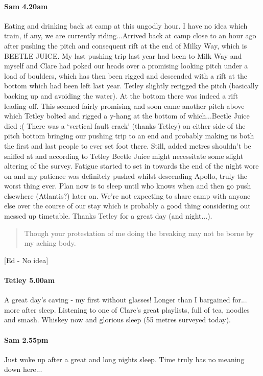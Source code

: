 \paragraph{Sam 4.20am}
Eating and drinking back at camp at this ungodly hour. I have no idea which train, if any, we are currently riding...Arrived back at camp close to an hour ago after pushing the pitch and consequent rift at the end of Milky Way, which is BEETLE JUICE. My last pushing trip last year had been to Milk Way and myself and Clare had poked our heads over a promising looking pitch under a load of boulders, which has then been rigged and descended with a rift at the bottom which had been left last year. Tetley slightly rerigged the pitch (basically backing up and avoiding the water). At the bottom there was indeed a rift leading off. This seemed fairly promising and soon came another pitch above which Tetley bolted and rigged a y-hang at the bottom of which...Beetle Juice died :( There was a ‘vertical fault crack’ (thanks Tetley) on either side of the pitch bottom bringing our pushing trip to an end and probably making us both the first and last people to ever set foot there. Still, added metres shouldn't be sniffed at and according to Tetley Beetle Juice might necessitate some slight altering of the survey. Fatigue started to set in towards the end of the night wore on and my patience was definitely pushed whilst descending Apollo, truly the worst thing ever. Plan now is to sleep until who knows when and then go push elsewhere (Atlantis?) later on. We’re not expecting to share camp with anyone else over the course of our stay which is probably a good thing considering out messed up timetable.
Thanks Tetley for a great day (and night...). 



\begin{quote}Though your protestation of me doing the breaking may not be borne by my aching body. \end{quote} 
[Ed - No idea]


\paragraph{Tetley 5.00am}
A great day’s caving - my first without glasses! Longer than I bargained for... more after sleep. Listening to one of Clare’s great playlists, full of tea, noodles and smash. Whiskey now and glorious sleep (55 metres surveyed today).

\paragraph{Sam 2.55pm}
Just woke up after a great and long nights sleep. Time truly has no meaning down here...


